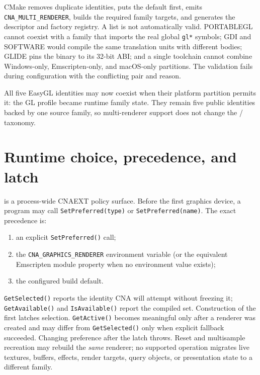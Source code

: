 CMake removes duplicate identities, puts the default first, emits
\texttt{CNA\_MULTI\_RENDERER}, builds the required family targets, and generates the descriptor
and factory registry. A list is not automatically valid. PORTABLEGL cannot coexist with a family
that imports the real global \texttt{gl*} symbols; GDI and SOFTWARE would compile the same
translation units with different bodies; GLIDE pins the binary to its 32-bit ABI; and a single
toolchain cannot combine Windows-only, Emscripten-only, and macOS-only partitions. The validation
fails during configuration with the conflicting pair and reason.

All five EasyGL identities may now coexist when their platform partition permits it: the GL
profile became runtime family state. They remain five public identities backed by one source
family, so multi-renderer support does not change the \RendererIdentityCount{}/\RendererFamilyCount{}
taxonomy.

\section{Runtime choice, precedence, and latch}

 is a process-wide CNAEXT policy surface. Before the
first graphics device, a program may call \texttt{SetPreferred(type)} or
\texttt{SetPreferred(name)}. The exact precedence is:

\begin{enumerate}
  \item an explicit \texttt{SetPreferred()} call;
  \item the \texttt{CNA\_GRAPHICS\_RENDERER} environment variable (or the equivalent Emscripten
        module property when no environment value exists);
  \item the configured build default.
\end{enumerate}

\texttt{GetSelected()} reports the identity CNA will attempt without freezing it;
\texttt{GetAvailable()} and \texttt{IsAvailable()} report the compiled set. Construction of the
first  latches selection. \texttt{GetActive()} becomes meaningful only
after a renderer was created and may differ from \texttt{GetSelected()} only when explicit
fallback succeeded. Changing preference after the latch throws. Reset and multisample recreation
may rebuild the \emph{same} renderer; no supported operation migrates live textures, buffers,
effects, render targets, query objects, or presentation state to a different family.

